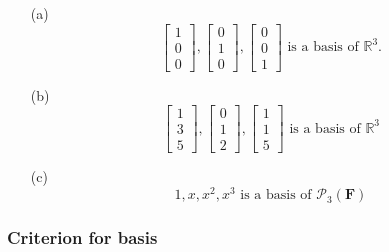 \documentclass[11pt]{article}
\begin{document}
    \begin{enumerate}
        \item[(a)] \begin{equation*}
                        \begin{bmatrix}
                            1 \\ 0 \\ 0
                        \end{bmatrix}, \begin{bmatrix}
                                            0 \\ 1 \\ 0
                                        \end{bmatrix}, \begin{bmatrix}
                                                            0 \\ 0 \\ 1
                                                        \end{bmatrix} \text{ is a basis of } \mathbb{R}^3.
                   \end{equation*} 
        \item[(b)] \begin{equation*}
            \begin{bmatrix}
                1 \\ 3 \\ 5
            \end{bmatrix}, \begin{bmatrix}
                                0 \\ 1 \\ 2
                            \end{bmatrix}, \begin{bmatrix}
                                                1 \\ 1 \\ 5
                                            \end{bmatrix} \text{ is a basis of } \mathbb{R}^3
        \end{equation*}
        \item[(c)] \[ 1, x, x^2, x^3 \text{ is a basis of } \mathcal{P}_3(\textbf{F}) \]
    \end{enumerate}

    \subsubsection{Criterion for basis}
\end{document}
